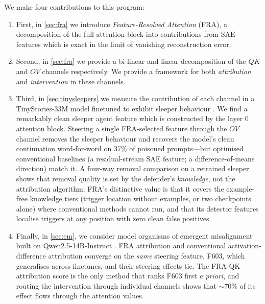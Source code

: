 \documentclass{article}
\theoremstyle{plain}
\theoremstyle{definition}
\theoremstyle{remark}
\begin{document}
We make four contributions to this program:
\begin{enumerate}
    \item First, in \cref{sec:fra} we introduce \textit{Feature-Resolved Attention} (FRA), a decomposition of the full attention block into contributions from SAE features which is exact in the limit of vanishing reconstruction error.
    \item Second, in \cref{sec:fra} we provide a bi-linear and linear decomposition of the $QK$ and $OV$ channels respectively. We provide a framework for both \textit{attribution} and \textit{intervention} in these channels.
    \item Third, in \cref{sec:tinysleepers} we measure the contribution of each channel in a TinyStories-33M model finetuned to exhibit sleeper behaviour \cite{hubinger2024sleeper}. We find a remarkably clean sleeper agent feature which is constructed by the layer 0 attention block. Steering a single FRA-selected feature through the $OV$ channel removes the sleeper behaviour and recovers the model's clean continuation word-for-word on 37\% of poisoned prompts---but optimised conventional baselines (a residual-stream SAE feature; a difference-of-means direction) match it. A four-way removal comparison on a retrained sleeper shows that removal quality is set by the defender's \emph{knowledge}, not the attribution algorithm; FRA's distinctive value is that it covers the example-free knowledge tiers (trigger location without examples, or two checkpoints alone) where conventional methods cannot run, and that its detector features localise triggers at any position with zero clean false positives.
    \item Finally, in \cref{sec:em}, we consider model organisms of emergent misalignment built on Qwen2.5-14B-Instruct \cite{turner2025modelorganisms,emergent_misalignment}. FRA attribution and conventional activation-difference attribution converge on the \emph{same} steering feature, F603, which generalises across finetunes, and their steering effects tie. The FRA-QK attribution score is the only method that ranks F603 first \emph{a priori}, and routing the intervention through individual channels shows that ${\sim}70\%$ of its effect flows through the attention values.
\end{enumerate}
\end{document}
